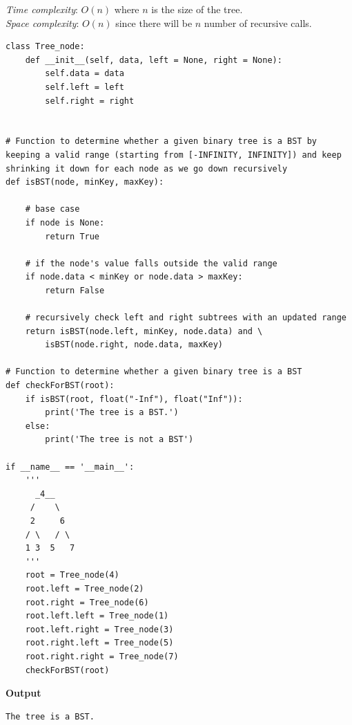 \documentclass[a4paper,11pt]{book}
\begin{document}
\noindent \textit{Time complexity}: $O(n)$ where $n$ is the size of the tree.\\
\noindent \textit{Space complexity}: $O(n)$ since there will be $n$ number of recursive calls.

\begin{lstlisting}
class Tree_node:
    def __init__(self, data, left = None, right = None):
        self.data = data
        self.left = left
        self.right = right
 
 
# Function to determine whether a given binary tree is a BST by keeping a valid range (starting from [-INFINITY, INFINITY]) and keep shrinking it down for each node as we go down recursively
def isBST(node, minKey, maxKey):
 
    # base case
    if node is None:
        return True
 
    # if the node's value falls outside the valid range
    if node.data < minKey or node.data > maxKey:
        return False
 
    # recursively check left and right subtrees with an updated range
    return isBST(node.left, minKey, node.data) and \
        isBST(node.right, node.data, maxKey)
 
# Function to determine whether a given binary tree is a BST
def checkForBST(root):
    if isBST(root, float("-Inf"), float("Inf")):
        print('The tree is a BST.')
    else:
        print('The tree is not a BST')
 
if __name__ == '__main__':
    '''
      _4__     
     /    \    
     2     6   
    / \   / \  
    1 3  5   7
    '''
    root = Tree_node(4)
    root.left = Tree_node(2)
    root.right = Tree_node(6)
    root.left.left = Tree_node(1)
    root.left.right = Tree_node(3)
    root.right.left = Tree_node(5)
    root.right.right = Tree_node(7)
    checkForBST(root)
\end{lstlisting}
\textbf{Output}
\begin{lstlisting}
The tree is a BST.
\end{lstlisting}
\end{document}
